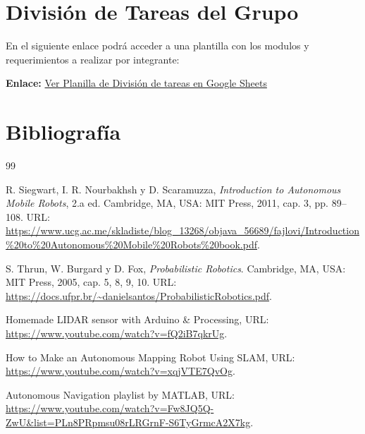 \documentclass[12pt,a4paper]{article}
\begin{document}
\section{División de Tareas del Grupo}

\begin{tcolorbox}[colframe=green!60!black, colback=green!5!white, arc=2mm, title=\textbf{División de tareas (Google Sheets)}]
  En el siguiente enlace podrá acceder a una plantilla con los modulos y requerimientos a realizar por integrante:
  \vspace{0.2cm}

  \textbf{Enlace:} \href{https://docs.google.com/spreadsheets/d/1GAEeQZzlFaMgwrWLOeSPeK0nOuYQg2peXEuDazYDfk4/edit?usp=sharing}{Ver Planilla de División de tareas en Google Sheets}
\end{tcolorbox}

\section{Bibliografía}

\begin{thebibliography}{99}

R. Siegwart, I. R. Nourbakhsh y D. Scaramuzza,
\textit{Introduction to Autonomous Mobile Robots}, 2.a ed.
Cambridge, MA, USA: MIT Press, 2011, cap. 3, pp. 89--108.
URL: \url{https://www.ucg.ac.me/skladiste/blog_13268/objava_56689/fajlovi/Introduction%20to%20Autonomous%20Mobile%20Robots%20book.pdf}.

S. Thrun, W. Burgard y D. Fox,
\textit{Probabilistic Robotics}.
Cambridge, MA, USA: MIT Press, 2005, cap. 5, 8, 9, 10.
URL: \url{https://docs.ufpr.br/~danielsantos/ProbabilisticRobotics.pdf}.

Homemade LIDAR sensor with Arduino \& Processing,
URL: \url{https://www.youtube.com/watch?v=fQ2iB7qkrUg}.

How to Make an Autonomous Mapping Robot Using SLAM,
URL: \url{https://www.youtube.com/watch?v=xqjVTE7QvOg}.

Autonomous Navigation playlist by MATLAB,
URL: \url{https://www.youtube.com/watch?v=Fw8JQ5Q-ZwU&list=PLn8PRpmsu08rLRGrnF-S6TyGrmcA2X7kg}.



\end{thebibliography}
\end{document}
